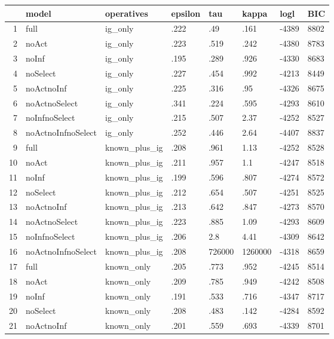 \begin{table}[ht]
\centering
\begin{tabular}{rlllllll}
  \hline
 & model & operatives & epsilon & tau & kappa & logl & BIC \\ 
  \hline
1 & full & ig\_only & .222 & .49 & .161 & -4389 & 8802 \\ 
  2 & noAct & ig\_only & .223 & .519 & .242 & -4380 & 8783 \\ 
  3 & noInf & ig\_only & .195 & .289 & .926 & -4330 & 8683 \\ 
  4 & noSelect & ig\_only & .227 & .454 & .992 & -4213 & 8449 \\ 
  5 & noActnoInf & ig\_only & .225 & .316 & .95 & -4326 & 8675 \\ 
  6 & noActnoSelect & ig\_only & .341 & .224 & .595 & -4293 & 8610 \\ 
  7 & noInfnoSelect & ig\_only & .215 & .507 & 2.37 & -4252 & 8527 \\ 
  8 & noActnoInfnoSelect & ig\_only & .252 & .446 & 2.64 & -4407 & 8837 \\ 
  9 & full & known\_plus\_ig & .208 & .961 & 1.13 & -4252 & 8528 \\ 
  10 & noAct & known\_plus\_ig & .211 & .957 & 1.1 & -4247 & 8518 \\ 
  11 & noInf & known\_plus\_ig & .199 & .596 & .807 & -4274 & 8572 \\ 
  12 & noSelect & known\_plus\_ig & .212 & .654 & .507 & -4251 & 8525 \\ 
  13 & noActnoInf & known\_plus\_ig & .213 & .642 & .847 & -4273 & 8570 \\ 
  14 & noActnoSelect & known\_plus\_ig & .223 & .885 & 1.09 & -4293 & 8609 \\ 
  15 & noInfnoSelect & known\_plus\_ig & .206 & 2.8 & 4.41 & -4309 & 8642 \\ 
  16 & noActnoInfnoSelect & known\_plus\_ig & .208 & 726000 & 1260000 & -4318 & 8659 \\ 
  17 & full & known\_only & .205 & .773 & .952 & -4245 & 8514 \\ 
  18 & noAct & known\_only & .209 & .785 & .949 & -4242 & 8508 \\ 
  19 & noInf & known\_only & .191 & .533 & .716 & -4347 & 8717 \\ 
  20 & noSelect & known\_only & .208 & .483 & .142 & -4284 & 8592 \\ 
  21 & noActnoInf & known\_only & .201 & .559 & .693 & -4339 & 8701 \\ 

\end{tabular}
\end{table}
